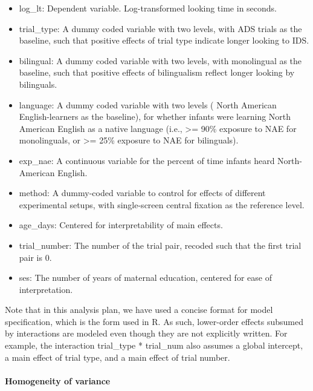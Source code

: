 \documentclass[
  english,
  ,man,floatsintext]{apa6}
\providecommand{\tightlist}{%
  \setlength{\itemsep}{0pt}\setlength{\parskip}{0pt}}
\let\oldparagraph\paragraph
\renewcommand{\paragraph}[1]{\oldparagraph{#1}\mbox{}}
\begin{document}
\begin{itemize}
\tightlist
\item
  log\_lt: Dependent variable. Log-transformed looking time in seconds.
\item
  trial\_type: A dummy coded variable with two levels, with ADS trials as the baseline, such that positive effects of trial type indicate longer looking to IDS.
\item
  bilingual: A dummy coded variable with two levels, with monolingual as the baseline, such that positive effects of bilingualism reflect longer looking by bilinguals.
\item
  language: A dummy coded variable with two levels ( North American English-learners as the baseline), for whether infants were learning North American English as a native language (i.e., \textgreater= 90\% exposure to NAE for monolinguals, or \textgreater= 25\% exposure to NAE for bilinguals).
\item
  exp\_nae: A continuous variable for the percent of time infants heard North-American English.
\item
  method: A dummy-coded variable to control for effects of different experimental setups, with single-screen central fixation as the reference level.
\item
  age\_days: Centered for interpretability of main effects.
\item
  trial\_number: The number of the trial pair, recoded such that the first trial pair is 0.
\item
  ses: The number of years of maternal education, centered for ease of interpretation.
\end{itemize}

Note that in this analysis plan, we have used a concise format for model specification, which is the form used in R. As such, lower-order effects subsumed by interactions are modeled even though they are not explicitly written. For example, the interaction trial\_type * trial\_num also assumes a global intercept, a main effect of trial type, and a main effect of trial number.

\hypertarget{homogeneity-of-variance}{%
\paragraph{Homogeneity of variance}\label{homogeneity-of-variance}}
\end{document}
